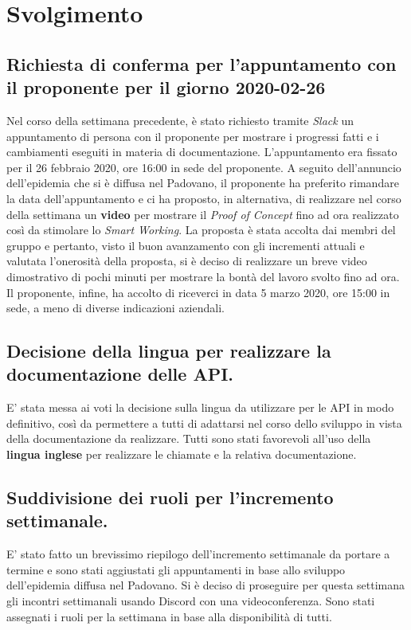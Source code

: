 \newpage
\section*{Svolgimento}

	\subsection*{Richiesta di conferma per l'appuntamento con il proponente per il giorno 2020-02-26}
		Nel corso della settimana precedente, è stato richiesto tramite \textit{Slack} un appuntamento di persona con il proponente per mostrare i progressi fatti e i cambiamenti eseguiti in materia di documentazione. L'appuntamento era fissato per il 26 febbraio 2020, ore 16:00 in sede del proponente. A seguito dell'annuncio dell'epidemia che si è diffusa nel Padovano, il proponente ha preferito rimandare la data dell'appuntamento e ci ha proposto, in alternativa, di realizzare nel corso della settimana un \textbf{video} per mostrare il \textit{Proof of Concept} fino ad ora realizzato così da stimolare lo \textit{Smart Working}. La proposta è stata accolta dai membri del gruppo e pertanto, visto il buon avanzamento con gli incrementi attuali e valutata l'onerosità della proposta, si è deciso di realizzare un breve video dimostrativo di pochi minuti per mostrare la bontà del lavoro svolto fino ad ora. Il proponente, infine, ha accolto di riceverci in data 5 marzo 2020, ore 15:00 in sede, a meno di diverse indicazioni aziendali.

	\subsection*{Decisione della lingua per realizzare la documentazione delle API.}
		E' stata messa ai voti la decisione sulla lingua da utilizzare per le API in modo definitivo, così da permettere a tutti di adattarsi nel corso dello sviluppo in vista della documentazione da realizzare. Tutti sono stati favorevoli all'uso della \textbf{lingua inglese} per realizzare le chiamate e la relativa documentazione.

	\subsection*{Suddivisione dei ruoli per l'incremento settimanale.}
		E' stato fatto un brevissimo riepilogo dell'incremento settimanale da portare a termine e sono stati aggiustati gli appuntamenti in base allo sviluppo dell'epidemia diffusa nel Padovano. Si è deciso di proseguire per questa settimana gli incontri settimanali usando Discord con una videoconferenza. Sono stati assegnati i ruoli per la settimana in base alla disponibilità di tutti.

